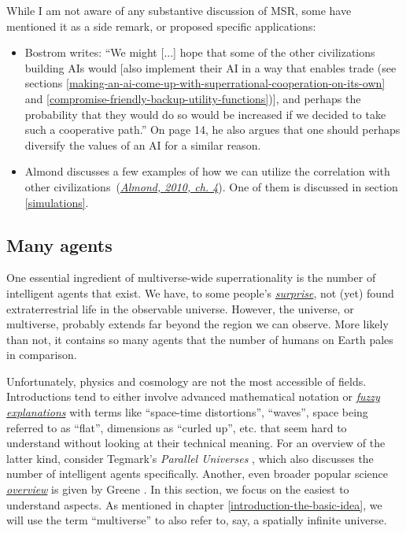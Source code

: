 While I am not aware of any substantive discussion of MSR, some have
mentioned it as a side remark, or proposed specific applications:

\begin{itemize}
\item
  Bostrom writes: ``We might {[}...{]}
  hope that some of the other civilizations building AIs would {[}also
  implement their AI in a way that enables trade (see sections
  \ref{making-an-ai-come-up-with-superrational-cooperation-on-its-own} and
  \ref{compromise-friendly-backup-utility-functions}){]}, and perhaps the probability that
  they would do so would be increased if we decided to take such a
  cooperative path.'' \parencite{Bostrom2014-gy} On page 14, he also argues that one should perhaps
  diversify the values of an AI for a similar reason.
\item
  Almond discusses a few examples of how we can utilize the correlation
  with other
  civilizations~(\href{https://casparoesterheld.files.wordpress.com/2017/03/correlation2.pdf}{\emph{Almond,
  2010, ch. 4}}). One of them is discussed in section \ref{simulations}.
\end{itemize}

\hypertarget{many-agents}{\subsection{Many agents}\label{many-agents}}

One essential ingredient of multiverse-wide superrationality is the
number of intelligent agents that exist. We have, to some people's
\href{https://en.wikipedia.org/wiki/Fermi_paradox}{\emph{surprise}}, not
(yet) found extraterrestrial life in the observable universe. However,
the universe, or multiverse, probably extends far beyond the region we
can observe. More likely than not, it contains so many agents that the
number of humans on Earth pales in comparison.

Unfortunately, physics and cosmology are not the most accessible of
fields. Introductions tend to either involve advanced mathematical
notation or
\href{http://lesswrong.com/lw/ip/fake_explanations/}{\emph{fuzzy
explanations}} with terms like ``space-time distortions'', ``waves'',
space being referred to as ``flat'', dimensions as ``curled up'', etc.
that seem hard to understand without looking at their technical meaning.
For an overview of the latter kind, consider Tegmark's
\emph{Parallel Universes} \parencite{Tegmark2003-sl},
which also discusses the number of intelligent agents specifically.
Another, even broader popular science
\href{https://en.wikipedia.org/wiki/Multiverse\#Brian_Greene.27s_nine_types}{\emph{overview}}
is given by Greene \parencite{Greene2011-hv}. In this section, we
focus on the easiest to understand aspects. As mentioned in chapter
\ref{introduction-the-basic-idea}, we will use the term ``multiverse'' to also refer
to, say, a spatially infinite universe.

